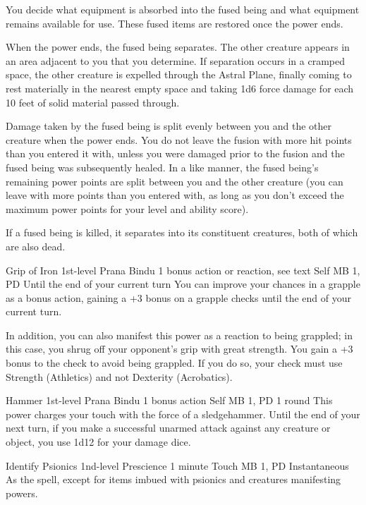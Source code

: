   You decide what equipment is absorbed into the fused being
  and what equipment remains available for use.
  These fused items are restored once the power ends.
  
  When the power ends,
  the fused being separates.
  The other creature appears in an area adjacent to you that you determine.
  If separation occurs in a cramped space,
  the other creature is expelled through the Astral Plane,
  finally coming to rest materially in the nearest empty space
  and taking 1d6 force damage
  for each 10 feet of solid material passed through.
  
  Damage taken by the fused being is split evenly
  between you and the other creature when the power ends.
  You do not leave the fusion with more hit points
  than you entered it with,
  unless you were damaged prior to the fusion
  and the fused being was subsequently healed.
  In a like manner,
  the fused being's remaining power points are split
  between you and the other creature
  (you can leave with more points than you entered with,
  as long as you don't exceed the maximum power points
  for your level and ability score).
  
  If a fused being is killed,
  it separates into its constituent creatures,
  both of which are also dead.

\DndPowerHeader%
  {Grip of Iron}
  {1st-level Prana Bindu}
  {1 bonus action or reaction, see text}
  {Self}
  {MB 1, PD \lvlone}
  {Until the end of your current turn}
  You can improve your chances in a grapple as a bonus action,
  gaining a +3 bonus on a grapple checks until
  the end of your current turn.

  In addition, you can also manifest this power
  as a reaction to being grappled; in this case, you shrug
  off your opponent's grip with great strength.
  You gain a +3 bonus to the check to avoid being grappled.
  If you do so,
  your check must use Strength (Athletics) and not
  Dexterity (Acrobatics).

\DndPowerHeader%
  {Hammer}
  {1st-level Prana Bindu}
  {1 bonus action}
  {Self}
  {MB 1, PD \lvlone}
  {1 round}
This power charges your touch with the force of a sledgehammer.
Until the end of your next turn,
if you make a successful unarmed attack against any creature or object,
you use 1d12 for your damage dice.

\DndPowerHeader%
  {Identify Psionics}
  {1nd-level Prescience}
  {1 minute}
  {Touch}
  {MB 1, PD \lvlone}
  {Instantaneous}
As the  spell,
except for items imbued with psionics
and creatures manifesting powers.

